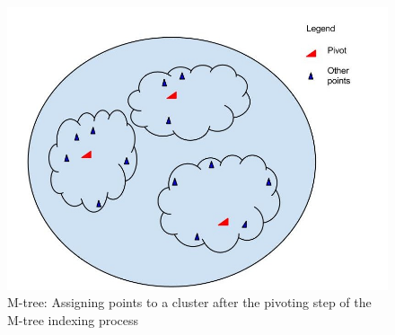 \begin{figure}[ht]	
\centering
\includegraphics[width=0.7 \columnwidth]{img/image0a.jpg}
\caption{M-tree: Assigning points to a cluster after the pivoting step of the M-tree indexing process}
\label{fig:4.1}
\end{figure}

